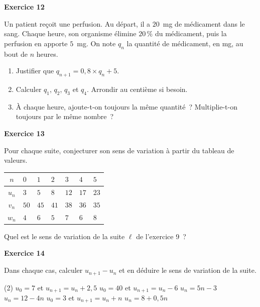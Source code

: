 \documentclass[a4paper,11pt]{article}
\newenvironment{exercice}[1]{%
  \Needspace{6\baselineskip}\par\bigskip\noindent\textbf{Exercice #1}\par\smallskip\noindent\ignorespaces
}{%
  \par
}
\begin{document}
\begin{exercice}{12}
Un patient reçoit une perfusion. Au départ, il a $20$~mg de médicament dans le sang. Chaque heure, son organisme élimine $20\,\%$ du médicament, puis la perfusion en apporte $5$~mg. On note $q_n$ la quantité de médicament, en mg, au bout de $n$ heures.
\begin{enumerate}[label=\arabic*.]
\item Justifier que $q_{n+1} = 0{,}8 \times q_n + 5$.
\item Calculer $q_1$, $q_2$, $q_3$ et $q_4$. Arrondir au centième si besoin.
\item À chaque heure, ajoute-t-on toujours la même quantité~? Multiplie-t-on toujours par le même nombre~?
\end{enumerate}
\end{exercice}

\begin{exercice}{13}
Pour chaque suite, conjecturer son sens de variation à partir du tableau de valeurs.

\renewcommand{\arraystretch}{1.3}
\begin{center}
\begin{tabular}{|c|*{6}{C{0.9cm}|}}
  \hline
  $n$ & $0$ & $1$ & $2$ & $3$ & $4$ & $5$ \\
  \hline
  $u_n$ & $3$ & $5$ & $8$ & $12$ & $17$ & $23$ \\
  \hline
  $v_n$ & $50$ & $45$ & $41$ & $38$ & $36$ & $35$ \\
  \hline
  $w_n$ & $4$ & $6$ & $5$ & $7$ & $6$ & $8$ \\
  \hline
\end{tabular}
\end{center}
Quel est le sens de variation de la suite $\ell$ de l'exercice 9~?
\end{exercice}

\begin{exercice}{14}
Dans chaque cas, calculer $u_{n+1} - u_n$ et en déduire le sens de variation de la suite.
\begin{tasks}(2)
\task $u_0 = 7$ et $u_{n+1} = u_n + 2{,}5$
\task $u_0 = 40$ et $u_{n+1} = u_n - 6$
\task $u_n = 5n - 3$
\task $u_n = 12 - 4n$
\task $u_0 = 3$ et $u_{n+1} = u_n + n$
\task $u_n = 8 + 0{,}5n$
\end{tasks}
\end{exercice}
\end{document}
